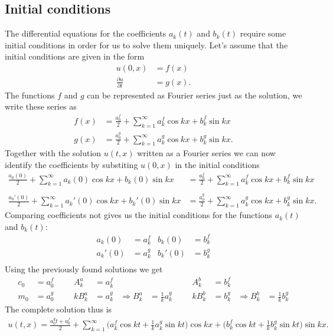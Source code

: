 \subsection{Initial conditions}
The differential equations for the coefficients $a_k(t)$ and $b_k(t)$
require some initial conditions in order for us to solve them uniquely.
Let's assume that the initial conditions are given in the form
\begin{align*}
u(0,x)&=f(x)\\
\frac{\partial u}{\partial t}&=g(x).
\end{align*}
The functions $f$ and $g$ can be represented as Fourier series just as the
solution, we write these series as
\begin{align*}
f(x)&=\frac{a_0^f}2+\sum_{k=1}^\infty a_k^f\cos kx+b_k^f\sin kx\\
g(x)&=\frac{a_0^g}2+\sum_{k=1}^\infty a_k^g\cos kx+b_k^g\sin kx.
\end{align*}
Together with the solution $u(t,x)$ written as a Fourier series 
we can now identify the coefficients by substiting $u(0,x)$ in
the initial conditions
\begin{align*}
\frac{a_0(0)}2+\sum_{k=1}^\infty a_k(0)\cos kx +b_k(0)\sin kx
&=
\frac{a_0^f}2+\sum_{k=1}^\infty a_k^f\cos kx+b_k^f\sin kx\\
\\
\frac{a_0'(0)}2+\sum_{k=1}^\infty a_k'(0)\cos kx+b_k'(0)\sin kx
&=
\frac{a_0^g}2+\sum_{k=1}^\infty a_k^g\cos kx+b_k^g\sin kx.
\end{align*}
Comparing coefficients not gives us the initial conditions
for the functions $a_k(t)$ and $b_k(t)$:
\begin{align*}
a_k(0)&=a_k^f&b_k(0)&=b_k^f\\
a_k'(0)&=a_k^g&b_k'(0)&=b_k^g\\
\end{align*}
Using the previously found solutions we get
\begin{align*}
c_0&=a_0^f&&&A_k^a&=a_k^f&&&&&A_k^b&=b_k^f\\
m_0&=a_0^g&&&kB_k^a&=a_k^g&\Rightarrow B_k^a&=\frac1ka_k^g&&&kB_k^b&=b_k^g&\Rightarrow B_k^b&=\frac1kb_k^g
\end{align*}
The complete solution thus is
\begin{align*}
u(t,x)=\frac{a_0^gt+a_0^f}2
+\sum_{k=1}^\infty
\biggl(a_k^f\cos kt+\frac1ka_k^g\sin kt\biggr)\cos kx
+
\biggl(b_k^f\cos kt+\frac1kb_k^g\sin kt\biggr)\sin kx.
\end{align*}

